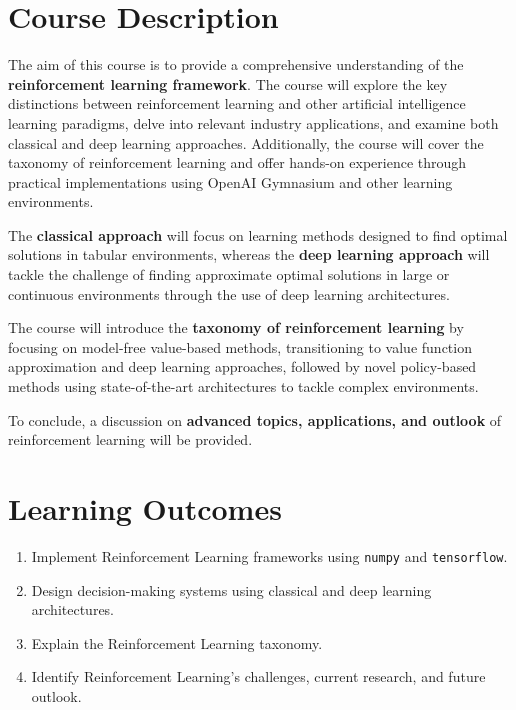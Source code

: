 \documentclass[
  letterpaper,
  DIV=11,
  numbers=noendperiod]{scrreprt}
\providecommand{\tightlist}{%
  \setlength{\itemsep}{0pt}\setlength{\parskip}{0pt}}\usepackage{longtable,booktabs,array}
\begin{document}
\section{Course Description}\label{course-description}

The aim of this course is to provide a comprehensive understanding of
the \textbf{reinforcement learning framework}. The course will explore
the key distinctions between reinforcement learning and other artificial
intelligence learning paradigms, delve into relevant industry
applications, and examine both classical and deep learning approaches.
Additionally, the course will cover the taxonomy of reinforcement
learning and offer hands-on experience through practical implementations
using OpenAI Gymnasium and other learning environments.

The \textbf{classical approach} will focus on learning methods designed
to find optimal solutions in tabular environments, whereas the
\textbf{deep learning approach} will tackle the challenge of finding
approximate optimal solutions in large or continuous environments
through the use of deep learning architectures.

The course will introduce the \textbf{taxonomy of reinforcement
learning} by focusing on model-free value-based methods, transitioning
to value function approximation and deep learning approaches, followed
by novel policy-based methods using state-of-the-art architectures to
tackle complex environments.

To conclude, a discussion on \textbf{advanced topics, applications, and
outlook} of reinforcement learning will be provided.

\section{Learning Outcomes}\label{learning-outcomes}

\begin{enumerate}
\def\labelenumi{\arabic{enumi}.}
\tightlist
\item
  Implement Reinforcement Learning frameworks using \texttt{numpy} and
  \texttt{tensorflow}.
\item
  Design decision-making systems using classical and deep learning
  architectures.
\item
  Explain the Reinforcement Learning taxonomy.
\item
  Identify Reinforcement Learning's challenges, current research, and
  future outlook.
\end{enumerate}
\end{document}
